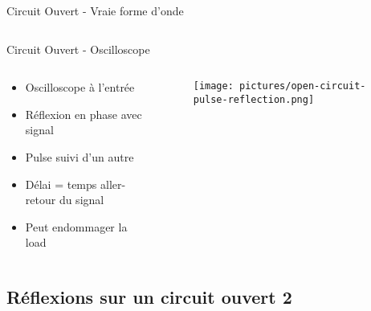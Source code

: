 \begin{frame}{Circuit Ouvert - Vraie forme d'onde}
\begin{columns}
\begin{column}{0.5\textwidth}
\begin{center}
{
            }
            \end{center}
        \end{column}
    \end{columns}
\end{frame}

\begin{frame}{Circuit Ouvert - Oscilloscope}
    \begin{columns}
        \begin{column}{0.6\textwidth}
            \begin{itemize}
                \item Oscilloscope à l'entrée
                \bigskip
                \item Réflexion en phase avec signal
                \item Pulse suivi d'un autre
                \item Délai = temps aller-retour du signal
                \bigskip
                \item Peut endommager la load
            \end{itemize}
        \end{column}
        
        \begin{column}{0.4\textwidth}
            \begin{figure}
                \centering
                \texttt{[image: pictures/open-circuit-pulse-reflection.png]}
            \end{figure}
        \end{column}
    \end{columns}
\end{frame}



\subsection{Réflexions sur un circuit ouvert 2}


